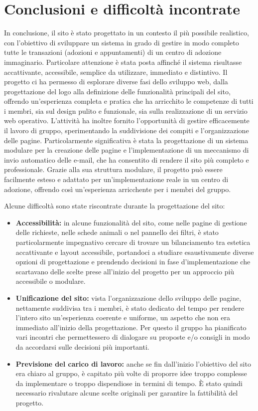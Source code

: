 \documentclass[a4paper,10pt]{article}
\begin{document}
	\section{Conclusioni e difficoltà incontrate}
	In conclusione, il sito è stato progettato in un contesto il più possibile realistico, con l'obiettivo di sviluppare un sistema in grado di gestire in modo completo tutte le transazioni (adozioni e appuntamenti) di un centro di adozione immaginario. Particolare attenzione è stata posta affinché il sistema risultasse accattivante, accessibile, semplice da utilizzare, immediato e distintivo.
	Il progetto ci ha permesso di esplorare diverse fasi dello sviluppo web, dalla progettazione del logo alla definizione delle funzionalità principali del sito, offrendo un'esperienza completa e pratica che ha arricchito le competenze di tutti i membri, sia sul design pulito e funzionale, sia sulla realizzazione di un servizio web operativo.
	L'attività ha inoltre fornito l'opportunità di gestire efficacemente il lavoro di gruppo, sperimentando la suddivisione dei compiti e l'organizzazione delle pagine. Particolarmente significativa è stata la progettazione di un sistema modulare per la creazione delle pagine e l'implementazione di un meccanismo di invio automatico delle e-mail, che ha consentito di rendere il sito più completo e professionale.
	Grazie alla sua struttura modulare, il progetto può essere facilmente esteso e adattato per un'implementazione reale in un centro di adozione, offrendo così un'esperienza arricchente per i membri del gruppo.
	
	\vspace{0.5cm}

	Alcune difficoltà sono state riscontrate durante la progettazione del sito:
	\begin{itemize}
		\item \textbf{Accessibilità:} in alcune funzionalità del sito, come nelle pagine di gestione delle richieste, nelle schede animali o nel pannello dei filtri, è stato particolarmente impegnativo cercare di trovare un bilanciamento tra estetica accattivante e layout accessibile, portandoci a studiare esaustivamente diverse opzioni di progettazione e prendendo decisioni in fase d'implementazione che scartavano delle scelte prese all'inizio del progetto per un approccio più accessibile o modulare.
		\item \textbf{Unificazione del sito:} vista l'organizzazione dello sviluppo delle pagine, nettamente suddivisa tra i membri, è stato dedicato del tempo per rendere l'intero sito un'esperienza coerente e uniforme, un aspetto che non era immediato all'inizio della progettazione. Per questo il gruppo ha pianificato vari incontri che permettessero di dialogare su proposte e/o consigli in modo da accordarsi sulle decisioni più importanti.
		\item \textbf{Previsione del carico di lavoro:} anche se fin dall'inizio l'obiettivo del sito era chiaro al gruppo, è capitato più volte di proporre idee troppo complesse da implementare o troppo dispendiose in termini di tempo. È stato quindi necessario rivalutare alcune scelte originali per garantire la fattibilità del progetto.
	\end{itemize}
\end{document}

